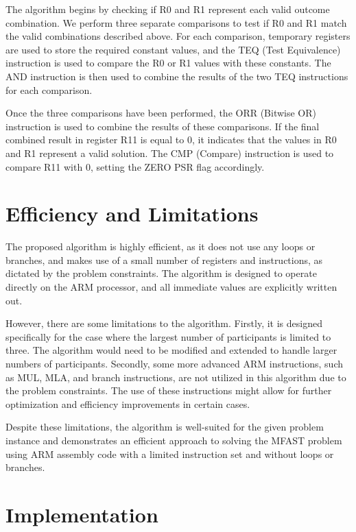 \begin{enumerate}
The algorithm begins by checking if R0 and R1 represent each valid outcome combination. We perform three separate comparisons to test if R0 and R1 match the valid combinations described above. For each comparison, temporary registers are used to store the required constant values, and the TEQ (Test Equivalence) instruction is used to compare the R0 or R1 values with these constants. The AND instruction is then used to combine the results of the two TEQ instructions for each comparison.

Once the three comparisons have been performed, the ORR (Bitwise OR) instruction is used to combine the results of these comparisons. If the final combined result in register R11 is equal to 0, it indicates that the values in R0 and R1 represent a valid solution. The CMP (Compare) instruction is used to compare R11 with 0, setting the ZERO PSR flag accordingly.

\section{Efficiency and Limitations}

The proposed algorithm is highly efficient, as it does not use any loops or branches, and makes use of a small number of registers and instructions, as dictated by the problem constraints. The algorithm is designed to operate directly on the ARM processor, and all immediate values are explicitly written out.

However, there are some limitations to the algorithm. Firstly, it is designed specifically for the case where the largest number of participants is limited to three. The algorithm would need to be modified and extended to handle larger numbers of participants. Secondly, some more advanced ARM instructions, such as MUL, MLA, and branch instructions, are not utilized in this algorithm due to the problem constraints. The use of these instructions might allow for further optimization and efficiency improvements in certain cases.

Despite these limitations, the algorithm is well-suited for the given problem instance and demonstrates an efficient approach to solving the MFAST problem using ARM assembly code with a limited instruction set and without loops or branches.



\section{Implementation}


\end{enumerate}
